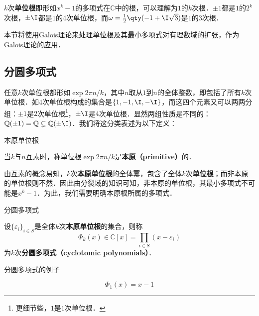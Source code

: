 



$k$次\textbf{单位根}即形如$x^k-1$的多项式在$\mathbb{C}$中的根，可以理解为$1$的$k$次根．$\pm 1$都是$1$的$2^k$次根，$\pm \I$都是$1$的$4$次单位根，而$\omega=\frac{1}{2}\qty(-1+\I\sqrt{3})$是$1$的$3$次根．

本节将使用Galois理论来处理单位根及其最小多项式对有理数域的扩张，作为Galois理论的应用．


\subsection{分圆多项式}

任意$k$次单位根都形如$\exp{2\pi n/k}$，其中$n$取从$1$到$n$的全体整数，即包括了所有$k$次单位根．如$4$次单位根构成的集合是$\{1, -1, \I, -\I\}$，而这四个元素又可以两两分组：$\pm 1$是$2$次单位根\footnote{更细节些，$1$是$1$次单位根．}，$\pm \I$是$4$次单位根．显然两组性质是不同的：$\mathbb{Q}(\pm 1)=\mathbb{Q}\subsetneq \mathbb{Q}(\pm\I)$．我们将这分类表述为以下定义：

\begin{definition}{本原单位根}

当$k$与$n$互素时，称单位根$\exp{2\pi n/k}$是\textbf{本原（primitive）}的．

\end{definition}

由互素的概念易知，$k$次\textbf{本原单位根}的全体幂，包含了全体$k$次\textbf{单位根}；而非本原的单位根则不然．因此由分裂域的知识可知，非本原的单位根，其最小多项式不可能是$x^k-1$．为此，我们需要明确本原根所属的多项式．

\begin{definition}{分圆多项式}

设$\{\varepsilon_i\}_{i\in S}$是全体$k$次\textbf{本原单位根}的集合，则称
\begin{equation}
\Phi_k(x)\in \mathbb{C}[x] = \prod_{i\in S}(x-\varepsilon_i)
\end{equation}
为$k$次\textbf{分圆多项式（cyclotomic polynomials）}．

\end{definition}




\begin{example}{分圆多项式的例子}

\begin{equation}
\Phi_1(x) = x-1
\end{equation}



\end{example}

















